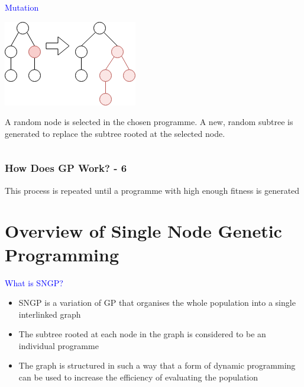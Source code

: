 \documentclass{beamer}
\newcommand{\blue}[1]{\textcolor{blue}{#1}}
\begin{document}
\begin{frame}
\begin{columns}[T]
\begin{column}{0.3\textwidth}
					\blue{Mutation}
					
					\medskip
					
					\includegraphics[scale=0.35]{resources/7_mutation}
					
					\begin{small}
						A random node is selected in the chosen programme. A new, random subtree is generated to replace the subtree rooted at the selected node.
					\end{small}
				\end{column}
				
			\end{columns}
			
		\end{frame}
	
		\begin{frame}
		
			\frametitle{How Does GP Work? - 6}
			
			This process is repeated until a programme with high enough fitness is generated
		
		\end{frame}
	
	
	\section{Overview of Single Node Genetic Programming}

		\begin{frame}
			
			\large{\blue{What is SNGP?}}
			
			\medskip
			
			\pause
			
			\begin{itemize}
				\item SNGP is a variation of GP that organises the whole population into a single interlinked graph
				
				\pause
				
				\item The subtree rooted at each node in the graph is considered to be an individual programme
				
				\pause
				
				\item The graph is structured in such a way that a form of dynamic programming can be used to increase the efficiency of evaluating the population
			\end{itemize}
			
		\end{frame}
	
\end{document}
